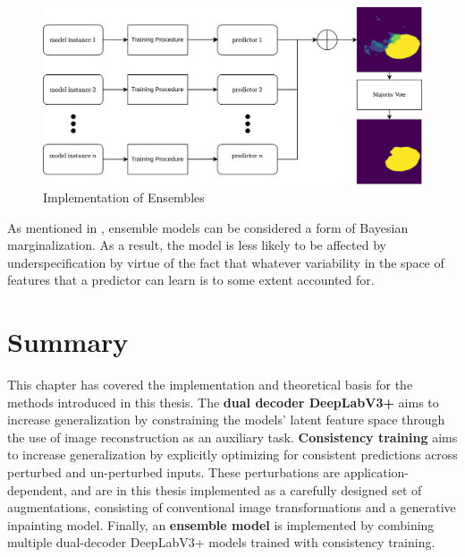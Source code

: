 \begin{figure}[h!]
    \centering
    \includegraphics[width=\linewidth]{illustrations/ensemble_config.png}
    \caption{Implementation of Ensembles}
    \label{fig:ensemble_setup}
\end{figure}

As mentioned in , ensemble models can be considered a form of Bayesian marginalization. As a result, the model is less likely to be affected by underspecification by virtue of the fact that whatever variability in the space of features that a predictor can learn is to some extent accounted for.  

\section{Summary}
This chapter has covered the implementation and theoretical basis for the methods introduced in this thesis. The \textbf{dual decoder DeepLabV3+} aims to increase generalization by constraining the models' latent feature space through the use of image reconstruction as an auxiliary task. \textbf{Consistency training} aims to increase generalization by explicitly optimizing for consistent predictions across perturbed and un-perturbed inputs. These perturbations are application-dependent, and are in this thesis implemented as a carefully designed set of augmentations, consisting of conventional image transformations and a generative inpainting model. Finally, an \textbf{ensemble model} is implemented by combining multiple dual-decoder DeepLabV3+ models trained with consistency training. 